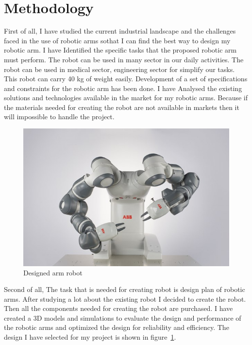 \section{Methodology}
First of all, I have studied the current industrial landscape and the challenges faced in the use of robotic arms sothat I can find the best way to design my robotic arm. 
 I have Identified the specific tasks that the proposed robotic arm must perform. The robot can be used in many sector in our daily activities. The robot can be used in medical sector, engineering sector for simplify our tasks. This robot can carry 40 kg of weight easily. Development of a set of specifications and constraints for the robotic arm has been done. I have Analysed the existing solutions and technologies available in the market for my robotic arms. Because if the materials needed for creating the robot are not available in markets then it will impossible to handle the project.\\ 
 \begin{figure}[h]
    \centering
    \includegraphics[width = .85\linewidth]{pic/2.jpeg}
    \caption{Designed arm robot}
    \label{fig:fig3}
\end{figure}
 Second of all, The task that is needed for creating robot is design plan of robotic arms. After studying a lot about the existing robot I decided to create the robot.
 Then all the components needed for creating the robot are purchased. I have created a 3D models and simulations to evaluate the design and performance of the robotic arms and optimized the design for reliability and efficiency. The design I have selected for my project is shown in figure~\ref{fig:fig3}.\\
